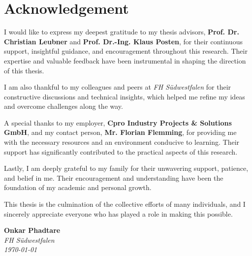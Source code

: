 
\chapter*{Acknowledgement}

\noindent
I would like to express my deepest gratitude to my thesis advisors, \textbf{Prof. Dr. Christian Leubner} and \textbf{Prof. Dr.-Ing. Klaus Posten}, for their continuous support, insightful guidance, and encouragement throughout this research. Their expertise and valuable feedback have been instrumental in shaping the direction of this thesis.

\noindent
I am also thankful to my colleagues and peers at \textit{FH Südwestfalen} for their constructive discussions and technical insights, which helped me refine my ideas and overcome challenges along the way.

\noindent
A special thanks to my employer, \textbf{Cpro Industry Projects \& Solutions GmbH}, and my contact person, \textbf{Mr. Florian Flemming}, for providing me with the necessary resources and an environment conducive to learning. Their support has significantly contributed to the practical aspects of this research.

\noindent
Lastly, I am deeply grateful to my family for their unwavering support, patience, and belief in me. Their encouragement and understanding have been the foundation of my academic and personal growth.

\noindent
This thesis is the culmination of the collective efforts of many individuals, and I sincerely appreciate everyone who has played a role in making this possible.

\vspace{1.5cm}
\noindent
\textbf{Onkar Phadtare} \\
\textit{FH Südwestfalen} \\
\textit{\today}

